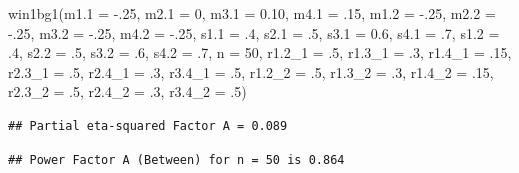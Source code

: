 \documentclass[
]{book}
\newenvironment{Shaded}{\begin{snugshade}}{\end{snugshade}}
\newcommand{\AttributeTok}[1]{\textcolor[rgb]{0.77,0.63,0.00}{#1}}
\newcommand{\DecValTok}[1]{\textcolor[rgb]{0.00,0.00,0.81}{#1}}
\newcommand{\FloatTok}[1]{\textcolor[rgb]{0.00,0.00,0.81}{#1}}
\newcommand{\FunctionTok}[1]{\textcolor[rgb]{0.00,0.00,0.00}{#1}}
\newcommand{\NormalTok}[1]{#1}
\newcommand{\SpecialCharTok}[1]{\textcolor[rgb]{0.00,0.00,0.00}{#1}}
\begin{document}
\begin{Shaded}
\begin{Highlighting}[]
\FunctionTok{win1bg1}\NormalTok{(}\AttributeTok{m1.1 =} \SpecialCharTok{{-}}\NormalTok{.}\DecValTok{25}\NormalTok{, }\AttributeTok{m2.1 =} \DecValTok{0}\NormalTok{, }\AttributeTok{m3.1 =} \FloatTok{0.10}\NormalTok{, }\AttributeTok{m4.1 =}\NormalTok{ .}\DecValTok{15}\NormalTok{, }
        \AttributeTok{m1.2 =} \SpecialCharTok{{-}}\NormalTok{.}\DecValTok{25}\NormalTok{, }\AttributeTok{m2.2 =} \SpecialCharTok{{-}}\NormalTok{.}\DecValTok{25}\NormalTok{, }\AttributeTok{m3.2 =} \SpecialCharTok{{-}}\NormalTok{.}\DecValTok{25}\NormalTok{, }\AttributeTok{m4.2 =} \SpecialCharTok{{-}}\NormalTok{.}\DecValTok{25}\NormalTok{, }
        \AttributeTok{s1.1 =}\NormalTok{ .}\DecValTok{4}\NormalTok{, }\AttributeTok{s2.1 =}\NormalTok{ .}\DecValTok{5}\NormalTok{, }\AttributeTok{s3.1 =} \FloatTok{0.6}\NormalTok{, }\AttributeTok{s4.1 =}\NormalTok{ .}\DecValTok{7}\NormalTok{, }\AttributeTok{s1.2 =}\NormalTok{ .}\DecValTok{4}\NormalTok{, }
        \AttributeTok{s2.2 =}\NormalTok{ .}\DecValTok{5}\NormalTok{, }\AttributeTok{s3.2 =}\NormalTok{ .}\DecValTok{6}\NormalTok{, }\AttributeTok{s4.2 =}\NormalTok{ .}\DecValTok{7}\NormalTok{,}
        \AttributeTok{n =} \DecValTok{50}\NormalTok{, }
        \AttributeTok{r1.2\_1 =}\NormalTok{ .}\DecValTok{5}\NormalTok{, }\AttributeTok{r1.3\_1 =}\NormalTok{ .}\DecValTok{3}\NormalTok{, }\AttributeTok{r1.4\_1 =}\NormalTok{ .}\DecValTok{15}\NormalTok{, }
        \AttributeTok{r2.3\_1 =}\NormalTok{ .}\DecValTok{5}\NormalTok{, }\AttributeTok{r2.4\_1 =}\NormalTok{ .}\DecValTok{3}\NormalTok{, }\AttributeTok{r3.4\_1 =}\NormalTok{ .}\DecValTok{5}\NormalTok{, }
        \AttributeTok{r1.2\_2 =}\NormalTok{ .}\DecValTok{5}\NormalTok{, }\AttributeTok{r1.3\_2 =}\NormalTok{ .}\DecValTok{3}\NormalTok{, }\AttributeTok{r1.4\_2 =}\NormalTok{ .}\DecValTok{15}\NormalTok{, }
        \AttributeTok{r2.3\_2 =}\NormalTok{ .}\DecValTok{5}\NormalTok{, }\AttributeTok{r2.4\_2 =}\NormalTok{ .}\DecValTok{3}\NormalTok{, }\AttributeTok{r3.4\_2 =}\NormalTok{ .}\DecValTok{5}\NormalTok{)}
\end{Highlighting}
\end{Shaded}

\begin{verbatim}
## Partial eta-squared Factor A = 0.089
\end{verbatim}

\begin{verbatim}
## Power Factor A (Between) for n = 50 is 0.864
\end{verbatim}
\end{document}
